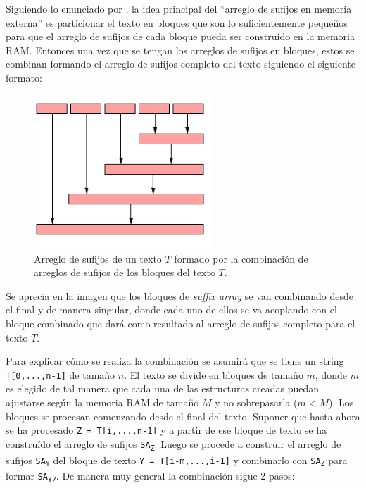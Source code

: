 Siguiendo lo enunciado por \cite{sascan}, la idea principal del ``arreglo de sufijos en memoria externa'' es particionar el texto en bloques que son lo suficientemente pequeños para que el arreglo de sufijos de cada bloque pueda ser construido en la memoria RAM. Entonces una vez que se tengan los arreglos de sufijos en bloques, estos se combinan formando el arreglo de sufijos completo del texto siguiendo el siguiente formato: 

\begin{figure}[h]
    \centering
    \includegraphics[width=0.6\textwidth]{./images/combinacionsascan.png}
    \caption{Arreglo de sufijos de un texto $T$ formado por la combinación de arreglos de sufijos de los bloques del texto $T$. }
    \label{fig:comb1}
\end{figure}

Se aprecia en la imagen que los bloques de \textit{suffix array} se van combinando desde el final y de manera singular, donde cada uno de ellos se va acoplando con el bloque combinado que dará como resultado al arreglo de sufijos completo para el texto $T$.

Para explicar cómo se realiza la combinación se asumirá que se tiene un string \texttt{T[0,...,n-1]} de tamaño $n$. El texto se divide en bloques de tamaño $m$, donde $m$ es elegido de tal manera que cada una de las estructuras creadas puedan ajustarse según la memoria RAM de tamaño $M$ y no sobrepasarla ($m<M$). Los bloques se procesan comenzando desde el final del texto. Suponer que hasta ahora se ha procesado \texttt{Z = T[i,...,n-1]} y a partir de ese bloque de texto se ha construído el arreglo de sufijos \texttt{SA\textsubscript{Z}}. Luego se procede a construir el arreglo de sufijos \texttt{SA\textsubscript{Y}} del bloque de texto \texttt{Y = T[i-m,...,i-1]} y combinarlo con \texttt{SA\textsubscript{Z}} para formar \texttt{SA\textsubscript{YZ}}. De manera muy general la combinación sigue 2 pasos:

